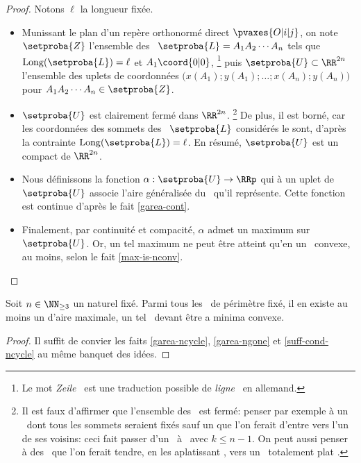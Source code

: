 \begin{proof}
	Notons $\ell$ la longueur fixée.
    \begin{itemize}
        \item Munissant le plan d'un repère orthonormé direct $\pvaxes{O | i | j}$, on note $\setproba{Z}$ l'ensemble des \ncycles\ $\setproba{L} = A_1 A_2 \cdots A_n$ tels que
        $\perim{\setproba{L}} = \ell$
        et
        $A_1\coord{0 | 0}$,%
        \footnote{
        	Le mot \og \emph{Zeile} \fg\ est une traduction possible de \og \emph{ligne} \fg\ en allemand.
        }
        puis $\setproba{U} \subset \RR^{2n}$ l'ensemble des uplets de coordonnées $\big( x(A_1) ; y(A_1) ; \dots ; x(A_n) ; y(A_n) \big)$ pour $A_1 A_2 \cdots A_n \in \setproba{Z}$.


        \item $\setproba{U}$ est clairement fermé dans $\RR^{2n}$.%
        \footnote{
        	Il est faux d'affirmer que l'ensemble des \ngones\ est fermé: penser par exemple à un \ngone\ dont tous les sommets seraient fixés sauf un que l'on ferait d'entre vers l'un de ses voisins: ceci fait passer d'un \ngone\ à \kgone\ avec $k \leq n-1$.
	        On peut aussi penser à des \ngones\ que l'on ferait tendre, en les \og aplatissant \fg, vers un \ncycle\ totalement \og plat \fg.
        }
        De plus, il est borné, car les coordonnées des sommets des \ncycles\ $\setproba{L}$ considérés le sont, d'après la contrainte $\perim{\setproba{L}} = \ell$.
        En résumé, $\setproba{U}$ est un compact de $\RR^{2n}$.


        \item Nous définissons la fonction $\alpha: \setproba{U} \rightarrow \RRp$ qui à un uplet de $\setproba{U}$ associe l'aire généralisée du \ncycle\ qu'il représente.
        Cette fonction est continue d'après le fait \ref{garea-cont}.


        \item Finalement, par continuité et compacité, $\alpha$ admet un maximum sur $\setproba{U}$.
        Or, un tel maximum ne peut être atteint qu'en un \ngone\ convexe, au moins, selon le fait \ref{max-is-nconv}.
    \end{itemize}
\end{proof}




\begin{fact} \label{suff-cond}
    Soit $n \in \NN_{\geq3}$ un naturel fixé.
    Parmi tous les \ngones\ de périmètre fixé, il en existe au moins un d'aire maximale, un tel \ngone\ devant être a minima convexe.
\end{fact}


\begin{proof}
    Il suffit de convier les faits \ref{garea-ncycle}, \ref{garea-ngone} et \ref{suff-cond-ncycle} au même banquet des idées.
\end{proof}
